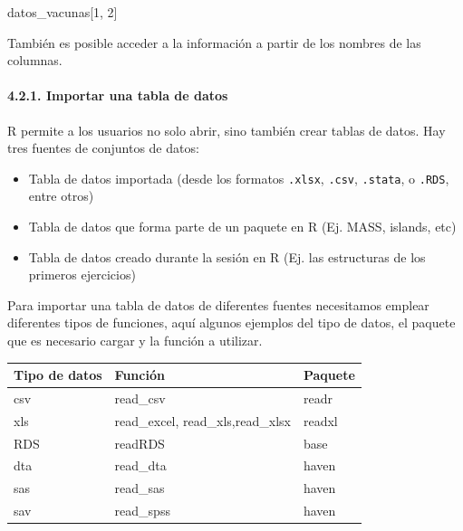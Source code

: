 \documentclass[
]{article}
\newenvironment{Shaded}{\begin{snugshade}}{\end{snugshade}}
\newcommand{\DecValTok}[1]{\textcolor[rgb]{0.00,0.00,0.81}{#1}}
\newcommand{\NormalTok}[1]{#1}
\newcommand{\SpecialCharTok}[1]{\textcolor[rgb]{0.81,0.36,0.00}{\textbf{#1}}}
\providecommand{\tightlist}{%
  \setlength{\itemsep}{0pt}\setlength{\parskip}{0pt}}
\begin{document}
\begin{Shaded}
\begin{Highlighting}[]
\NormalTok{datos\_vacunas[}\DecValTok{1}\NormalTok{, }\DecValTok{2}\NormalTok{]}
\end{Highlighting}
\end{Shaded}

También es posible acceder a la información a partir de los nombres de
las columnas.

\begin{Shaded}
\end{Shaded}

\paragraph{4.2.1. Importar una tabla de
datos}\label{importar-una-tabla-de-datos}

R permite a los usuarios no solo abrir, sino también crear tablas de
datos. Hay tres fuentes de conjuntos de datos:

\begin{itemize}
\tightlist
\item
  Tabla de datos importada (desde los formatos \texttt{.xlsx},
  \texttt{.csv}, \texttt{.stata}, o \texttt{.RDS}, entre otros)
\item
  Tabla de datos que forma parte de un paquete en R (Ej. MASS, islands,
  etc)
\item
  Tabla de datos creado durante la sesión en R (Ej. las estructuras de
  los primeros ejercicios)
\end{itemize}

Para importar una tabla de datos de diferentes fuentes necesitamos
emplear diferentes tipos de funciones, aquí algunos ejemplos del tipo de
datos, el paquete que es necesario cargar y la función a utilizar.

\begin{longtable}[]{@{}lll@{}}
\toprule\noalign{}
Tipo de datos & Función & Paquete \\
\midrule\noalign{}
\endhead
\bottomrule\noalign{}
\endlastfoot
csv & read\_csv & readr \\
xls & read\_excel, read\_xls,read\_xlsx & readxl \\
RDS & readRDS & base \\
dta & read\_dta & haven \\
sas & read\_sas & haven \\
sav & read\_spss & haven \\
\end{longtable}
\end{document}
